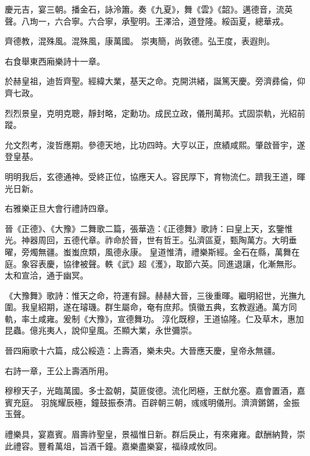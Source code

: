 \begin{pinyinscope}
 慶元吉，宴三朝。播金石，詠泠簫。奏《九夏》，舞《雲》《韶》。邁德音，流英聲。八珣一，六合寧。六合寧，承聖明。王澤洽，道登隆。綏函夏，總華戎。



 齊德教，混殊風。混殊風，康萬國。
 崇夷簡，尚敦德。弘王度，表遐則。



 右食舉東西廂樂詩十一章。



 於赫皇祖，迪哲齊聖。經緯大業，基天之命。克開洪緒，誕篤天慶。旁濟彞倫，仰齊七政。



 烈烈景皇，克明克聰，靜封略，定勳功。成民立政，儀刑萬邦。式固崇軌，光紹前蹤。



 允文烈考，浚哲應期。參德天地，比功四時。大亨以正，庶績咸熙。肇啟晉宇，遂登皇基。



 明明我后，玄德通神。受終正位，協應天人。容民厚下，育物流仁。躋我王道，暉光日新。



 右雅樂正旦大會行禮詩四章。



 晉《正德》、《大豫》二舞歌二篇，張華造：《正德舞》歌詩：曰皇上天，玄鑒惟光。神器周回，五德代章。祚命於晉，世有哲王。弘濟區夏，甄陶萬方。大明垂曜，旁燭無疆。蚩蚩庶類，風德永康。
 皇道惟清，禮樂斯經。金石在縣，萬舞在庭。象容表慶，協律被聲。軼《武》超《濩》，取節六英。同進退讓，化漸無形。太和宣洽，通于幽冥。



 《大豫舞》歌詩：惟天之命，符運有歸。赫赫大晉，三後重暉。繼明紹世，光撫九圍。我皇紹期，遂在璿璣。群生屬命，奄有庶邦。慎徽五典，玄教遐通。萬方同軌，率土咸雍。爰制《大豫》，宣德舞功。
 淳化既穆，王道協隆。仁及草木，惠加昆蟲。億兆夷人，說仰皇風。丕顯大業，永世彌崇。



 晉四廂歌十六篇，成公綏造：上壽酒，樂未央。大晉應天慶，皇帝永無疆。



 右詩一章，王公上壽酒所用。



 穆穆天子，光臨萬國。多士盈朝，莫匪俊德。流化罔極，王猷允塞。嘉會置酒，嘉賓充庭。
 羽旄耀辰極，鐘鼓振泰清。百辟朝三朝，彧彧明儀刑。濟濟鏘鏘，金振玉聲。



 禮樂具，宴嘉賓。眉壽祚聖皇，景福惟日新。群后戾止，有來雍雍。獻酬納贄，崇此禮容。豐肴萬俎，旨酒千鐘。嘉樂盡樂宴，福祿咸攸同。




\end{pinyinscope}
